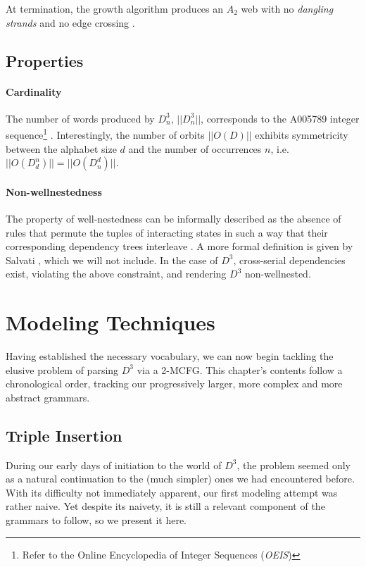 \documentclass[nonatbib,numbers,10pt]{llncs}
\begin{document}
At termination, the growth algorithm produces an $A_2$ web with no \textit{dangling strands} and no edge crossing \cite{petersen}.
\subsection{Properties}
\paragraph{Cardinality}
The number of words produced by $D^3_n$, $| \! | D^3_n | \! |$, corresponds to the A005789 integer sequence\footnote{Refer to the Online Encyclopedia of Integer Sequences (\textit{OEIS})} \cite{moortgat}.
Interestingly, the number of orbits $| \! | O(D) | \! |$ exhibits symmetricity between the alphabet size $d$ and the number of occurrences $n$, i.e. $| \! | O(D^n_d) | \! | = | \! | O(D^d_n) | \! |$.

\paragraph{Non-wellnestedness}
The property of well-nestedness can be informally described as the absence of rules that permute the tuples of interacting states in such a way that their corresponding dependency trees interleave \cite{joshi}. A more formal definition is given by Salvati \cite{salvati}, which we will not include. In the case of $D^3$, cross-serial dependencies exist, violating the above constraint, and rendering $D^3$ non-wellnested.

\section{Modeling Techniques}\label{sec2}
Having established the necessary vocabulary, we can now begin tackling the elusive problem of parsing $D^3$ via a 2-MCFG. This chapter's contents follow a chronological order, tracking our progressively larger, more complex and more abstract grammars.
\subsection{Triple Insertion}
During our early days of initiation to the world of $D^3$, the problem seemed only as a natural continuation to the (much simpler) ones we had encountered before. With its difficulty not immediately apparent, our first modeling attempt was rather naive. Yet despite its naivety, it is still a relevant component of the grammars to follow, so we present it here.
\end{document}
